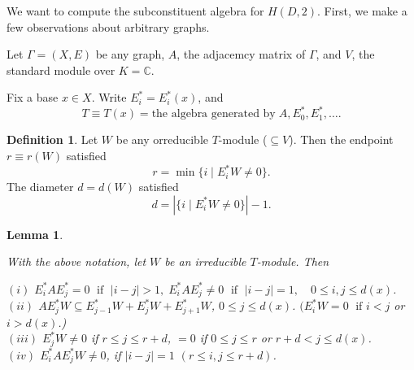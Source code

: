 \documentclass[
]{book}
\newtheorem{lemma}{Lemma}[chapter]
\theoremstyle{definition}
\newtheorem{definition}{Definition}[chapter]
\theoremstyle{definition}
\theoremstyle{definition}
\theoremstyle{definition}
\theoremstyle{remark}
\begin{document}
We want to compute the subconstituent algebra for \(H(D,2)\). First, we make a few observations about arbitrary graphs.

Let \(\Gamma = (X,E)\) be any graph, \(A\), the adjacemcy matrix of \(\Gamma\), and \(V\), the standard module over \(K = \mathbb{C}\).

Fix a base \(x\in X\). Write \(E_i^* = E_i^*(x)\), and
\[T \equiv T(x) = \text{the algebra generated by}\; A, E_0^*, E_1^*, \ldots .\]

\begin{definition}
Let \(W\) be any orreducible \(T\)-module (\(\subseteq V\)). Then the endpoint \(r \equiv r(W)\) satisfied
\[r = \min\{i\mid E_i^*W \neq 0\}.\]
The diameter \(d = d(W)\) satisfied
\[d = |\{i\mid E_i^*W \neq 0\}| - 1.\]
\end{definition}

\begin{lemma}
\protect\hypertarget{lem:irreducible}{}\label{lem:irreducible}

With the above notation, let \(W\) be an irreducible \(T\)-module. Then

\((i)\) \(E_i^*AE_j^* = 0 \; \text{ if }\; |i-j|>1, \; E_i^*AE_j^*\neq 0 \; \text{ if }\; |i-j| = 1, \quad 0\leq i,j\leq d(x)\).\\
\((ii)\) \(AE_j^*W \subseteq E_{j-1}^*W + E_j^*W + E^*_{j+1}W\), \(0\leq j \leq d(x)\). \((E_i^*W = 0 \; \text{ if } i<j\) or \(i > d(x)\).)\\
\((iii)\) \(E^*_jW \neq 0\) if \(r\leq j \leq r+d\), \(=0\) if \(0\leq j\leq r\) or \(r+d < j \leq d(x)\).\\
\((iv)\) \(E_i^*AE^*_jW \neq 0\), if \(|i-j| = 1\) \((r \leq i,j \leq r+d)\).

\end{lemma}
\end{document}
